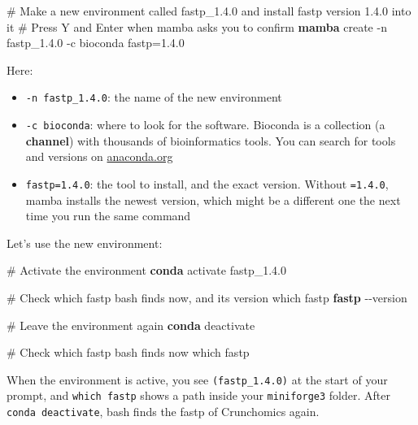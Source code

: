 \documentclass[
  letterpaper,
  DIV=11,
  numbers=noendperiod]{scrreprt}
\newenvironment{Shaded}{}{}
\newcommand{\AttributeTok}[1]{\textcolor[rgb]{0.84,0.23,0.29}{#1}}
\newcommand{\CommentTok}[1]{\textcolor[rgb]{0.42,0.45,0.49}{#1}}
\newcommand{\ExtensionTok}[1]{\textcolor[rgb]{0.84,0.23,0.29}{\textbf{#1}}}
\newcommand{\FunctionTok}[1]{\textcolor[rgb]{0.44,0.26,0.76}{#1}}
\newcommand{\NormalTok}[1]{\textcolor[rgb]{0.14,0.16,0.18}{#1}}
\providecommand{\tightlist}{%
  \setlength{\itemsep}{0pt}\setlength{\parskip}{0pt}}
\begin{document}
\begin{Shaded}
\begin{Highlighting}[]
\CommentTok{\# Make a new environment called fastp\_1.4.0 and install fastp version 1.4.0 into it}
\CommentTok{\# Press Y and Enter when mamba asks you to confirm}
\ExtensionTok{mamba}\NormalTok{ create }\AttributeTok{{-}n}\NormalTok{ fastp\_1.4.0 }\AttributeTok{{-}c}\NormalTok{ bioconda fastp=1.4.0}
\end{Highlighting}
\end{Shaded}

Here:

\begin{itemize}
\tightlist
\item
  \texttt{-n\ fastp\_1.4.0}: the name of the new environment
\item
  \texttt{-c\ bioconda}: where to look for the software. Bioconda is a
  collection (a \textbf{channel}) with thousands of bioinformatics
  tools. You can search for tools and versions on
  \href{https://anaconda.org/bioconda}{anaconda.org}
\item
  \texttt{fastp=1.4.0}: the tool to install, and the exact version.
  Without \texttt{=1.4.0}, mamba installs the newest version, which
  might be a different one the next time you run the same command
\end{itemize}

Let's use the new environment:

\begin{Shaded}
\begin{Highlighting}[]
\CommentTok{\# Activate the environment}
\ExtensionTok{conda}\NormalTok{ activate fastp\_1.4.0}

\CommentTok{\# Check which fastp bash finds now, and its version}
\FunctionTok{which}\NormalTok{ fastp}
\ExtensionTok{fastp} \AttributeTok{{-}{-}version}

\CommentTok{\# Leave the environment again}
\ExtensionTok{conda}\NormalTok{ deactivate}

\CommentTok{\# Check which fastp bash finds now}
\FunctionTok{which}\NormalTok{ fastp}
\end{Highlighting}
\end{Shaded}

When the environment is active, you see \texttt{(fastp\_1.4.0)} at the
start of your prompt, and \texttt{which\ fastp} shows a path inside your
\texttt{miniforge3} folder. After \texttt{conda\ deactivate}, bash finds
the fastp of Crunchomics again.
\end{document}
